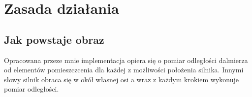 \section {Zasada działania}

\subsection {Jak powstaje obraz}

Opracowana przeze mnie implementacja opiera się o pomiar odległości dalmierza od elementów pomieszczcenia dla każdej z możliwości położenia silnika. Innymi słowy silnik obraca się w okół własnej osi a wraz z każdym krokiem wykonuje pomiar odległości.